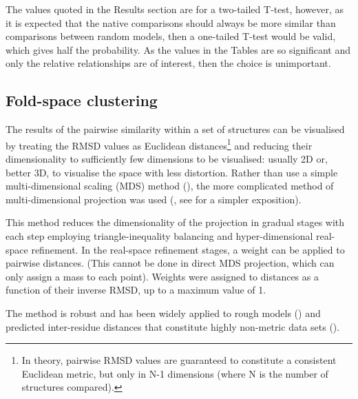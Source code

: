The values quoted in the Results section are for a two-tailed T-test, however, as it is expected
that the native comparisons should always be more similar than comparisons between random models,
then a one-tailed T-test would be valid, which gives half the probability.   As the values
in the Tables are so significant and only the relative relationships are of interest,
then the choice is unimportant.

\subsection{Fold-space clustering}

The results of the pairwise similarity within a set of structures can be visualised by treating the
RMSD values as Euclidean distances\footnote{In theory, pairwise RMSD values are guaranteed to constitute 
a consistent Euclidean metric, but only in N-1 dimensions (where N is the number of structures compared).
} and reducing their dimensionality to sufficiently few dimensions to be visualised: usually 2D or, 
better 3D, to visualise the space with less distortion.
Rather than use a simple multi-dimensional scaling (MDS) method (\cite{BrownNPet96}), the more complicated 
method of multi-dimensional projection was used (\cite{AszodiAet97a}, see \cite{TaylorWRet01b} for a
simpler exposition).  

This method reduces the dimensionality of the projection in gradual stages
with each step employing triangle-inequality balancing and hyper-dimensional real-space refinement.
In the real-space refinement stages, a weight can be applied to pairwise distances. (This cannot be
done in direct MDS projection, which can only assign a mass to each point).  
Weights were assigned to distances as a function of their inverse RMSD, up to a maximum value of 1.

The method is robust and
has been widely applied to rough models (\cite{TaylorWRet09a}) and predicted inter-residue distances that 
constitute highly non-metric data sets (\cite{AszodiAet94a}).

